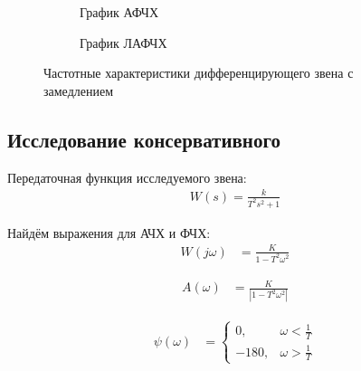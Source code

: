 \documentclass[a4paper, 12pt]{article}
\begin{document}
\begin{figure}[h!]
    \begin{subfigure}{0.5\textwidth}
        \centering
        \caption{График АФЧХ}
    \end{subfigure}
    \begin{subfigure}{0.5\textwidth}
        \centering
        \caption{График ЛАФЧХ}
    \end{subfigure}
    \caption{Частотные характеристики дифференцирующего звена с замедлением}
\end{figure}

\newpage
\begin{center}
	\section{Исследование консервативного }
\end{center}

\par 
Передаточная функция исследуемого звена:
\begin{align}
	W(s)=\frac{k}{T^2s^2 + 1}
\end{align}
\par 
Найдём выражения для АЧХ и ФЧХ:
\begin{align}
 W(j\omega) & = \frac{K}{1 - T^2\omega^2}
\end{align}

\begin{align}
 A(\omega) & = \frac{K}{|1 - T^2\omega^2|}
\end{align}

\begin{align}
\psi(\omega) & = \begin{cases}
0, & \omega < \frac{1}{T} \\
-180, & \omega > \frac{1}{T}
\end{cases}
\end{align}
\end{document}
